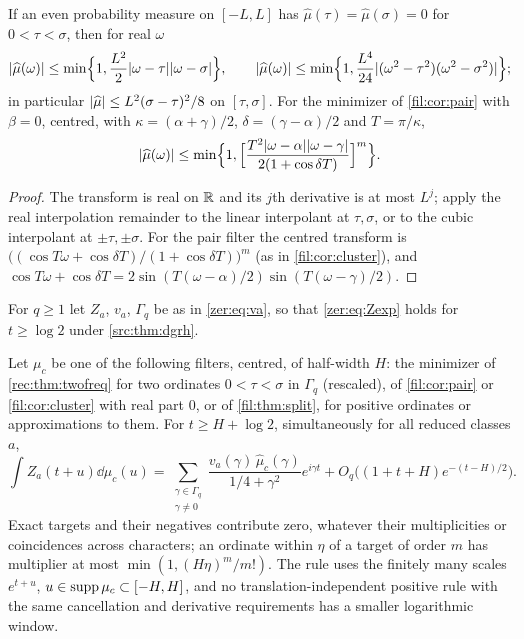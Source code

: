 \begin{proposition}\label{fil:prop:detune}
If an even probability measure on $[-L,L]$ has $\widehat\mu(\tau)=\widehat\mu(\sigma)=0$ for
$0<\tau<\sigma$, then for real $\omega$
\[
 \lvert\widehat\mu(\omega)\rvert\le\min\Bigl\{1,\frac{L^2}2\lvert\omega-\tau\rvert\lvert\omega-\sigma\rvert\Bigr\},\qquad
 \lvert\widehat\mu(\omega)\rvert\le\min\Bigl\{1,\frac{L^4}{24}\lvert(\omega^2-\tau^2)(\omega^2-\sigma^2)\rvert\Bigr\};
\]
in particular $\lvert\widehat\mu\rvert\le L^2(\sigma-\tau)^2/8$ on $[\tau,\sigma]$. For the minimizer of
\cref{fil:cor:pair} with $\beta=0$, centred, with $\kappa=(\alpha+\gamma)/2$, $\delta=(\gamma-\alpha)/2$ and
$T=\pi/\kappa$,
\[
 \lvert\widehat\mu(\omega)\rvert\le\min\Bigl\{1,\Bigl[\frac{T^2\lvert\omega-\alpha\rvert\lvert\omega-\gamma\rvert}{2(1+\cos\delta T)}\Bigr]^m\Bigr\}.
\]
\end{proposition}

\begin{proof}
The transform is real on $\mathbb{R}$ and its $j$th derivative is at most $L^j$; apply the real interpolation
remainder to the linear interpolant at $\tau,\sigma$, or to the cubic interpolant at $\pm\tau,\pm\sigma$.
For the pair filter the centred transform is $\bigl((\cos T\omega+\cos\delta T)/(1+\cos\delta T)\bigr)^m$ (as
in \cref{fil:cor:cluster}), and
$\cos T\omega+\cos\delta T=2\sin(T(\omega-\alpha)/2)\sin(T(\omega-\gamma)/2)$.
\end{proof}

For $q\ge1$ let $Z_a$, $v_a$, $\Gamma_q$ be as in \eqref{zer:eq:va}, so that \eqref{zer:eq:Zexp} holds for
$t\ge\log2$ under \cref{src:thm:dgrh}.

\begin{corollary}\label{fil:cor:rampdelete}
Let $\mu_c$ be one of the following filters, centred, of half-width $H$: the minimizer of
\cref{rec:thm:twofreq} for two ordinates $0<\tau<\sigma$ in $\Gamma_q$ (rescaled), of \cref{fil:cor:pair} or
\cref{fil:cor:cluster} with real part $0$, or of \cref{fil:thm:split}, for positive ordinates or approximations
to them. For $t\ge H+\log2$, simultaneously for all reduced classes $a$,
\[
 \int Z_a(t+u)\dd\mu_c(u)=\sum_{\substack{\gamma\in\Gamma_q\\\gamma\ne0}}\frac{v_a(\gamma)\,\widehat\mu_c(\gamma)}{1/4+\gamma^2}e^{i\gamma t}
 +O_q\bigl((1+t+H)e^{-(t-H)/2}\bigr).
\]
Exact targets and their negatives contribute zero, whatever their multiplicities or coincidences across
characters; an ordinate within $\eta$ of a target of order $m$ has multiplier at most
$\min(1,(H\eta)^m/m!)$. The rule uses the finitely many scales $e^{t+u}$, $u\in\operatorname{supp}\mu_c\subset[-H,H]$, and no
translation-independent positive rule with the same cancellation and derivative requirements has a smaller
logarithmic window.
\end{corollary}


